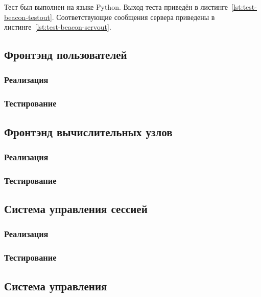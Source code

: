 \documentclass[a4paper,12pt]{report}
\numberwithin{equation}{section}
\begin{document}
Тест был выполнен на языке Python.
Выход теста приведён в листинге~\ref{lst:test-beacon-testout}.
Соответствующие сообщения сервера приведены в листинге~\ref{lst:test-beacon-servout}.





\subsection{Фронтэнд пользователей}
\subsubsection{Реализация}

\subsubsection{Тестирование}

\subsection{Фронтэнд вычислительных узлов}
\subsubsection{Реализация}

\subsubsection{Тестирование}
\subsection{Система управления сессией}
\subsubsection{Реализация}

\subsubsection{Тестирование}

\subsection{Система управления}
\end{document}
